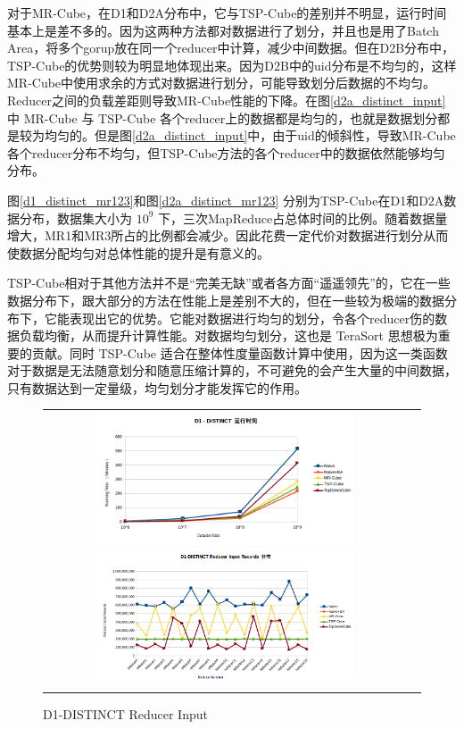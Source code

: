 对于MR-Cube，在D1和D2A分布中，它与TSP-Cube的差别并不明显，运行时间基本上是差不多的。因为这两种方法都对数据进行了划分，并且也是用了Batch Area，将多个gorup放在同一个reducer中计算，减少中间数据。但在D2B分布中，TSP-Cube的优势则较为明显地体现出来。因为D2B中的uid分布是不均匀的，这样MR-Cube中使用求余的方式对数据进行划分，可能导致划分后数据的不均匀。Reducer之间的负载差距则导致MR-Cube性能的下降。在图\ref{d2a_distinct_input}中 MR-Cube 与 TSP-Cube 各个reducer上的数据都是均匀的，也就是数据划分都是较为均匀的。但是图\ref{d2a_distinct_input}中，由于uid的倾斜性，导致MR-Cube各个reducer分布不均匀，但TSP-Cube方法的各个reducer中的数据依然能够均匀分布。

图\ref{d1_distinct_mr123}和图\ref{d2a_distinct_mr123} 分别为TSP-Cube在D1和D2A数据分布，数据集大小为 ${10}^{9}$ 下，三次MapReduce占总体时间的比例。随着数据量增大，MR1和MR3所占的比例都会减少。因此花费一定代价对数据进行划分从而使数据分配均匀对总体性能的提升是有意义的。

TSP-Cube相对于其他方法并不是``完美无缺”或者各方面``遥遥领先”的，它在一些数据分布下，跟大部分的方法在性能上是差别不大的，但在一些较为极端的数据分布下，它能表现出它的优势。它能对数据进行均匀的划分，令各个reducer伤的数据负载均衡，从而提升计算性能。对数据均匀划分，这也是 TeraSort 思想极为重要的贡献。同时 TSP-Cube 适合在整体性度量函数计算中使用，因为这一类函数对于数据是无法随意划分和随意压缩计算的，不可避免的会产生大量的中间数据，只有数据达到一定量级，均匀划分才能发挥它的作用。

\begin{figure}[!ht]
\begin{tabular}{cc}

\begin{minipage}[t]{0.5\textwidth}
\centering\includegraphics[width=3in]{picture/ch_experiment/d1_distinct_time} 
\caption{D1-DISTINCT 运行时间}\label{d1_distinct_time} 
\end{minipage}

\begin{minipage}[t]{0.5\textwidth}
\centering\includegraphics[width=3in]{picture/ch_experiment/d1_distinct_input} 
\caption{D1-DISTINCT Reducer Input}\label{d1_distinct_input} 
\end{minipage}

\end{tabular}
\end{figure}



